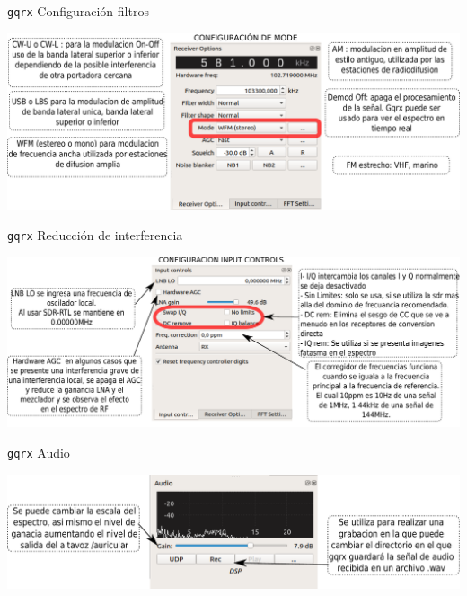 \begin{frame}{{\tt gqrx} Configuración filtros}

\begin{center}
\vspace{-0.3cm}
\includegraphics[width=.7\textwidth]{parte2/lab6/pdf/lab6_p_4.pdf}
\end{center}

\end{frame}

\begin{frame}{{\tt gqrx} Reducción de interferencia}

\begin{center}
\vspace{-0.3cm}
\includegraphics[width=.7\textwidth]{parte2/lab6/pdf/lab6_p_5.pdf}
\end{center}

\end{frame}

\begin{frame}{{\tt gqrx} Audio}

\begin{center}
\vspace{-0.3cm}
\includegraphics[width=.7\textwidth]{parte2/lab6/pdf/lab6_p_6.pdf}
\end{center}

\end{frame}

